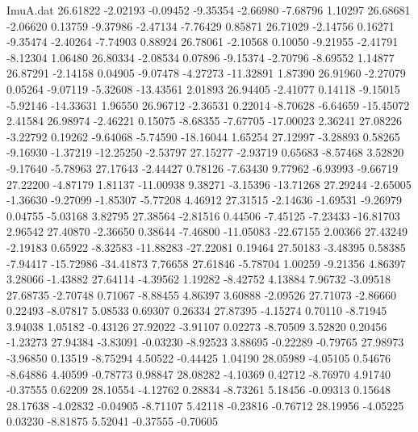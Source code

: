 \begin{filecontents}{ImuA.dat}
  26.61822   -2.02193   -0.09452   -9.35354   -2.66980   -7.68796    1.10297
  26.68681   -2.06620    0.13759   -9.37986   -2.47134   -7.76429    0.85871
  26.71029   -2.14756    0.16271   -9.35474   -2.40264   -7.74903    0.88924
  26.78061   -2.10568    0.10050   -9.21955   -2.41791   -8.12304    1.06480
  26.80334   -2.08534    0.07896   -9.15374   -2.70796   -8.69552    1.14877
  26.87291   -2.14158    0.04905   -9.07478   -4.27273  -11.32891    1.87390
  26.91960   -2.27079    0.05264   -9.07119   -5.32608  -13.43561    2.01893
  26.94405   -2.41077    0.14118   -9.15015   -5.92146  -14.33631    1.96550
  26.96712   -2.36531    0.22014   -8.70628   -6.64659  -15.45072    2.41584
  26.98974   -2.46221    0.15075   -8.68355   -7.67705  -17.00023    2.36241
  27.08226   -3.22792    0.19262   -9.64068   -5.74590  -18.16044    1.65254
  27.12997   -3.28893    0.58265   -9.16930   -1.37219  -12.25250   -2.53797
  27.15277   -2.93719    0.65683   -8.57468    3.52820   -9.17640   -5.78963
  27.17643   -2.44427    0.78126   -7.63430    9.77962   -6.93993   -9.66719
  27.22200   -4.87179    1.81137  -11.00938    9.38271   -3.15396  -13.71268
  27.29244   -2.65005   -1.36630   -9.27099   -1.85307   -5.77208    4.46912
  27.31515   -2.14636   -1.69531   -9.26979    0.04755   -5.03168    3.82795
  27.38564   -2.81516    0.44506   -7.45125   -7.23433  -16.81703    2.96542
  27.40870   -2.36650    0.38644   -7.46800  -11.05083  -22.67155    2.00366
  27.43249   -2.19183    0.65922   -8.32583  -11.88283  -27.22081    0.19464
  27.50183   -3.48395    0.58385   -7.94417  -15.72986  -34.41873    7.76658
  27.61846   -5.78704    1.00259   -9.21356    4.86397    3.28066   -1.43882
  27.64114   -4.39562    1.19282   -8.42752    4.13884    7.96732   -3.09518
  27.68735   -2.70748    0.71067   -8.88455    4.86397    3.60888   -2.09526
  27.71073   -2.86660    0.22493   -8.07817    5.08533    0.69307    0.26334
  27.87395   -4.15274    0.70110   -8.71945    3.94038    1.05182   -0.43126
  27.92022   -3.91107    0.02273   -8.70509    3.52820    0.20456   -1.23273
  27.94384   -3.83091   -0.03230   -8.92523    3.88695   -0.22289   -0.79765
  27.98973   -3.96850    0.13519   -8.75294    4.50522   -0.44425    1.04190
  28.05989   -4.05105    0.54676   -8.64886    4.40599   -0.78773    0.98847
  28.08282   -4.10369    0.42712   -8.76970    4.91740   -0.37555    0.62209
  28.10554   -4.12762    0.28834   -8.73261    5.18456   -0.09313    0.15648
  28.17638   -4.02832   -0.04905   -8.71107    5.42118   -0.23816   -0.76712
  28.19956   -4.05225    0.03230   -8.81875    5.52041   -0.37555   -0.70605

\end{filecontents}
